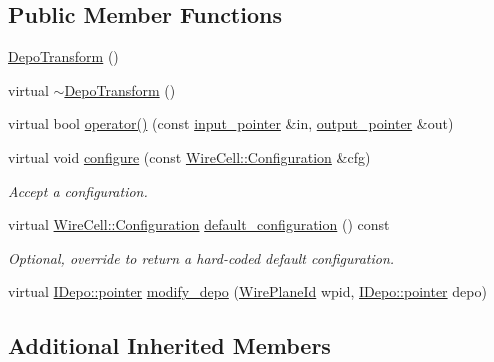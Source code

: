 \subsection*{Public Member Functions}
\begin{DoxyCompactItemize}
\item 
\hyperlink{class_wire_cell_1_1_gen_1_1_depo_transform_a575ebdc0a44dccfc869af36da1d3ed8c}{Depo\+Transform} ()
\item 
virtual \hyperlink{class_wire_cell_1_1_gen_1_1_depo_transform_ad50e4d263243c38ed402f3d8777f660f}{$\sim$\+Depo\+Transform} ()
\item 
virtual bool \hyperlink{class_wire_cell_1_1_gen_1_1_depo_transform_a72bd0b9e256a8e9f4311c61cf6b5692b}{operator()} (const \hyperlink{class_wire_cell_1_1_i_function_node_a55c0946156df9b712b8ad1a0b59b2db6}{input\+\_\+pointer} \&in, \hyperlink{class_wire_cell_1_1_i_function_node_afc02f1ec60d31aacddf64963f9ca650b}{output\+\_\+pointer} \&out)
\item 
virtual void \hyperlink{class_wire_cell_1_1_gen_1_1_depo_transform_ad9fc35a8293b4379fe5d6e34e7f3aee7}{configure} (const \hyperlink{namespace_wire_cell_a9f705541fc1d46c608b3d32c182333ee}{Wire\+Cell\+::\+Configuration} \&cfg)
\begin{DoxyCompactList}\small\item\em Accept a configuration. \end{DoxyCompactList}\item 
virtual \hyperlink{namespace_wire_cell_a9f705541fc1d46c608b3d32c182333ee}{Wire\+Cell\+::\+Configuration} \hyperlink{class_wire_cell_1_1_gen_1_1_depo_transform_aa3f2c3fcf0aae6b353296fd5d784cb8d}{default\+\_\+configuration} () const
\begin{DoxyCompactList}\small\item\em Optional, override to return a hard-\/coded default configuration. \end{DoxyCompactList}\item 
virtual \hyperlink{class_wire_cell_1_1_i_data_aff870b3ae8333cf9265941eef62498bc}{I\+Depo\+::pointer} \hyperlink{class_wire_cell_1_1_gen_1_1_depo_transform_a3d401800010c7691f3f298ae730eb395}{modify\+\_\+depo} (\hyperlink{class_wire_cell_1_1_wire_plane_id}{Wire\+Plane\+Id} wpid, \hyperlink{class_wire_cell_1_1_i_data_aff870b3ae8333cf9265941eef62498bc}{I\+Depo\+::pointer} depo)
\end{DoxyCompactItemize}
\subsection*{Additional Inherited Members}



